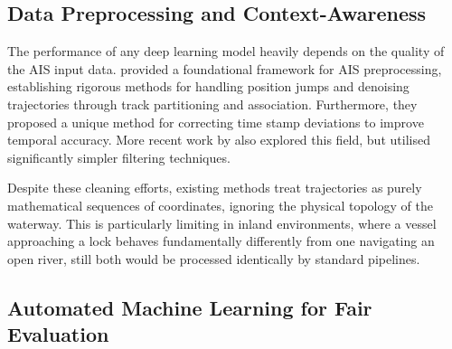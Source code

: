 \subsection*{Data Preprocessing and Context-Awareness}

The performance of any deep learning model heavily depends on the quality of the \ac{AIS} input data. \cite{Zhao_Shi_Yang_2018} provided a foundational framework for \ac{AIS} preprocessing, establishing rigorous methods for handling position jumps and denoising trajectories through track partitioning and association. Furthermore, they proposed a unique method for correcting time stamp deviations to improve temporal accuracy.
More recent work by \cite{zaman2024deep} also explored this field, but utilised significantly simpler filtering techniques.

Despite these cleaning efforts, existing methods treat trajectories as purely mathematical sequences of coordinates, ignoring the physical topology of the waterway. This is particularly limiting in inland environments, where a vessel approaching a lock behaves fundamentally differently from one navigating an open river, still both would be processed identically by standard pipelines.


\subsection*{Automated Machine Learning for Fair Evaluation}


